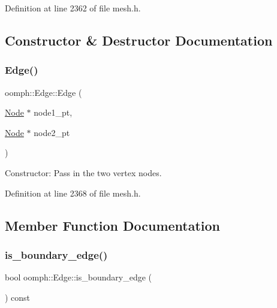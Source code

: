 Definition at line 2362 of file mesh.\+h.



\subsection{Constructor \& Destructor Documentation}
\mbox{\label{classoomph_1_1Edge_acf82b3fc446b2673499da51baac74c4b}} 
\subsubsection{\texorpdfstring{Edge()}{Edge()}}
{\footnotesize\ttfamily oomph\+::\+Edge\+::\+Edge (\begin{DoxyParamCaption}\item[{\hyperlink{classoomph_1_1Node}{Node} $\ast$}]{node1\+\_\+pt,  }\item[{\hyperlink{classoomph_1_1Node}{Node} $\ast$}]{node2\+\_\+pt }\end{DoxyParamCaption})\hspace{0.3cm}{\ttfamily [inline]}}



Constructor\+: Pass in the two vertex nodes. 



Definition at line 2368 of file mesh.\+h.



\subsection{Member Function Documentation}
\mbox{\label{classoomph_1_1Edge_aa19b9b455032267cae828ede9c6b5ad6}} 
\subsubsection{\texorpdfstring{is\+\_\+boundary\+\_\+edge()}{is\_boundary\_edge()}}
{\footnotesize\ttfamily bool oomph\+::\+Edge\+::is\+\_\+boundary\+\_\+edge (\begin{DoxyParamCaption}{ }\end{DoxyParamCaption}) const\hspace{0.3cm}{\ttfamily [inline]}}



